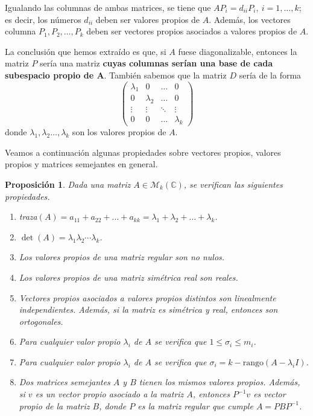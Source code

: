 \documentclass[11pt, a4paper]{article}
\newif\IfInSansMode
\numberwithin{equation}{section}
\newcommand{\bm}[1]{\boldsymbol{#1}}
\newcommand{\la}{\lambda}
\theoremstyle{theorem-style}
\newtheorem{nprop}{Proposición}[section]
\theoremstyle{definition-style}
\theoremstyle{remark-style}
\theoremstyle{example-style}
\newenvironment{nlist}
{\begin{enumerate}
    \renewcommand\labelenumi{(\emph{\roman{enumi})}}}
  {\end{enumerate}}
\begin{document}
Igualando las columnas de ambas matrices, se tiene que $AP_i = d_{ii}P_i, \ i =1,\dots,k$; es decir, los números $d_{ii}$ deben ser valores propios de $A$. Además, los vectores columna $P_1,P_2,\dots,P_k$ deben ser vectores propios asociados a valores propios de $A$.

La conclusión que hemos extraído es que, si $A$ fuese diagonalizable, entonces la matriz $P$ sería una matriz \textbf{cuyas columnas serían una base de cada subespacio propio de $\bm{A}$}. También sabemos que la matriz $D$ sería de la forma $$\begin{pmatrix}
  \lambda_1 & 0 & \hdots & 0 \\
  0 & \lambda_2 & \hdots & 0 \\
  \vdots & \vdots & \ddots & \vdots \\
  0 & 0 & \hdots & \lambda_k
\end{pmatrix}$$ donde $\lambda_1,\lambda_2\dots,\lambda_k$ son los valores propios de $A$.

Veamos a continuación algunas propiedades sobre vectores propios, valores propios y matrices semejantes en general.

\begin{nprop} \label{prop_matrices}
  Dada una matriz $A \in \mathcal M_k(\mathbb C)$, se verifican las siguientes propiedades.
  \begin{nlist}
  \item traza$(A) = a_{11} + a_{22} + \dots + a_{kk} = \lambda_1 + \lambda_2 +
    \dots + \lambda_k$.
  \item $\det(A) = \lambda_1\lambda_2\cdots \lambda_k$.
  \item Los valores propios de una matriz regular son no nulos.
  \item Los valores propios de una matriz simétrica real son reales.
  \item Vectores propios asociados a valores propios distintos son
    linealmente independientes. Además, si la matriz es simétrica y real, entonces son
    ortogonales.
  \item Para cualquier valor propio $\lambda_i$ de $A$ se verifica que $1 \leq \sigma_i
    \leq m_i$. 
    \item Para cualquier valor propio $\la_i$ de $A$ se verifica que $\sigma_i = k - \text{rango}(A - \lambda_i I)$.
  \item Dos matrices semejantes $A$ y $B$ tienen los mismos valores
    propios. Además, si $v$ es un vector propio asociado a la matriz $A$,
    entonces $P^{-1}v$ es vector propio de la matriz $B$, donde $P$ es la matriz
    regular que cumple $A = PBP^{-1}$.
  \end{nlist}
\end{nprop}
\end{document}
